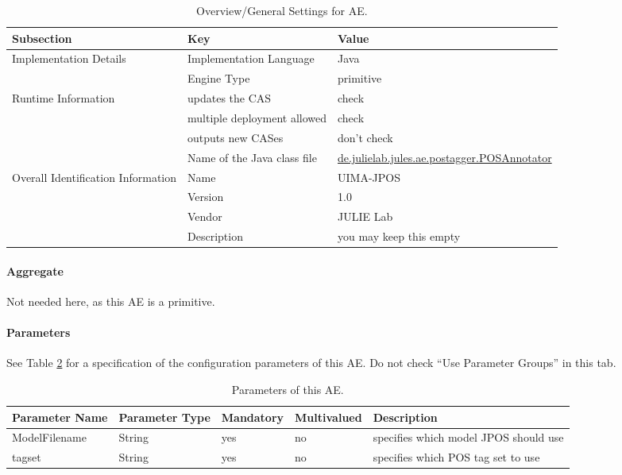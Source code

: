 \documentclass[11pt,a4paper,halfparskip]{scrartcl}
\begin{document}
\begin{table}[h!]
  \centering
  \begin{tabular}{|p{4cm}|p{4cm}|p{5cm}|}
    \hline
    Subsection & Key & Value \\
    \hline\hline
    Implementation Details & Implementation Language &  Java\\
    \cline{2-3}
    & Engine Type & primitive\\
    \hline
    Runtime Information & updates the CAS & check \\
    \cline{2-3}
    & multiple deployment allowed & check\\
    \cline{2-3}
    & outputs new CASes & don't check \\
    \cline{2-3}
    & Name of the Java class file & \url{de.julielab.jules.ae.postagger.POSAnnotator}\\
    \hline
    Overall Identification Information & Name & UIMA-JPOS \\
    \cline{2-3}
    & Version &  1.0\\
    \cline{2-3}
    & Vendor & JULIE Lab\\
    \cline{2-3}
    & Description & you may keep this empty\\
    \hline
  \end{tabular}
  \caption{Overview/General Settings for AE.}
  \label{tab:overview}
\end{table}


\paragraph{Aggregate}
Not needed here, as this AE is a primitive.

\paragraph{Parameters}
\label{sss:parameters}

See Table \ref{tab:parameters} for a specification of the
configuration parameters of this AE. Do not check ``Use Parameter
Groups'' in this tab.

\begin{table}[h!]
  \centering
  \begin{tabular}{|p{4cm}|p{2cm}|p{2cm}|p{2cm}|p{4cm}|}
    \hline
    Parameter Name & Parameter Type & Mandatory & Multivalued & Description \\
    \hline
    ModelFilename & String & yes & no & specifies which model JPOS
    should use\\ 
    \hline
    tagset & String & yes & no & specifies which POS tag set to use\\
    \hline\hline
  \end{tabular}
  \caption{Parameters of this AE.}
  \label{tab:parameters}
\end{table}
\end{document}
